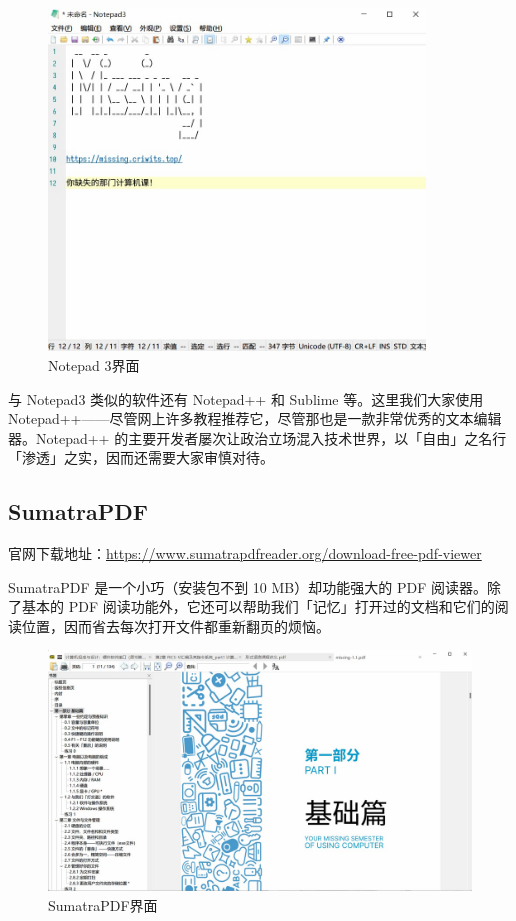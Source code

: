 \begin{figure}[htb!]
  \centering
  \includegraphics[width=10cm]{assets/Notepad3.jpg}
  \caption{Notepad 3界面}
  \label{Notepad3}
\end{figure}

与 Notepad3 类似的软件还有 Notepad++ 和 Sublime 等。这里我们大家使用 Notepad++——尽管网上许多教程推荐它，尽管那也是一款非常优秀的文本编辑器。Notepad++ 的主要开发者屡次让政治立场混入技术世界，以「自由」之名行「渗透」之实，因而还需要大家审慎对待。

\subsection{SumatraPDF}

官网下载地址：\url{https://www.sumatrapdfreader.org/download-free-pdf-viewer}

SumatraPDF 是一个小巧（安装包不到 10 MB）却功能强大的 PDF 阅读器。除了基本的 PDF 阅读功能外，它还可以帮助我们「记忆」打开过的文档和它们的阅读位置，因而省去每次打开文件都重新翻页的烦恼。

\begin{figure}[htb!]
  \centering
  \includegraphics[width=13cm]{assets/SumatraPDF.jpg}
  \caption{SumatraPDF界面}
  \label{SumatraPDF}
\end{figure}

